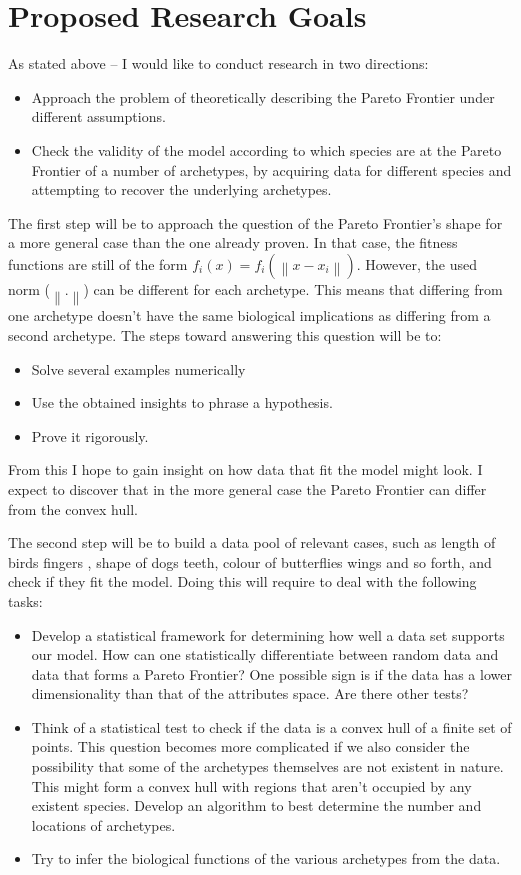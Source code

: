 \documentclass{article}
\theoremstyle{definition}
\theoremstyle{remark}
\def \norm [#1]{\left\| #1 \right\|}
\begin{document}
\section{Proposed Research Goals}
As stated above – I would like to conduct research in two directions:
\begin{itemize}
  \item Approach the problem of theoretically describing the Pareto Frontier under different assumptions.
  \item Check the validity of the model according to which species are at the Pareto Frontier 
        of a number of archetypes, 
        by acquiring data for different species and attempting to recover the underlying archetypes.
\end{itemize}
The first step will be to approach the question of the Pareto Frontier’s shape 
for a more general case than the one already proven. 
In that case, the fitness functions are still of the form 
$f_i(x) = f_i(\norm[x-x_i])$. However, the used norm ($\norm[.]$) can be different for each archetype. 
This means that differing from one archetype doesn’t have the same biological implications as differing 
from a second archetype. The steps toward answering this question will be to:
\begin{itemize}
  \item Solve several examples numerically
  \item Use the obtained insights to phrase a hypothesis. 
  \item Prove it rigorously.
\end{itemize}

From this I hope to gain insight on how data that fit the model might look. 
I expect to discover that in the more general case the Pareto Frontier can differ from the convex hull.

The second step will be to build a data pool of relevant cases, 
such as length of birds fingers , shape of dogs teeth, colour of butterflies wings and so forth, and check if they fit the model.
Doing this will require to deal with the following tasks:
\begin{itemize}
  \item Develop a statistical framework for determining how well a data set supports our model. 
	How can one statistically differentiate between random data and data that forms a Pareto Frontier? 
	One possible sign is if the data has a lower dimensionality than that of the attributes space. 
	Are there other tests?
  \item Think of a statistical test to check if the data is a convex hull of a finite set of points. 
	This question becomes more complicated if we also consider the possibility that some of the 
	archetypes themselves are not existent in nature. 
	This might form a convex hull with regions that aren't occupied by any existent species. 
	Develop an algorithm to best determine the number and locations of archetypes.
  \item Try to infer the biological functions of the various archetypes from the data.
\end{itemize}
\end{document}
